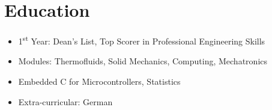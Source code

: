 \documentclass{cv}
\begin{document}
\section{Education}
\begin{subsections}
    \subtitle{MEng Mechanical Engineering \hfill London, United Kingdom}
    \begin{itemize}
        \item 1\textsuperscript{st} Year: Dean's List, Top Scorer in Professional Engineering Skills
        \item Modules: Thermofluids, Solid Mechanics, Computing, Mechatronics
        \item Embedded C for Microcontrollers, Statistics
        \item Extra-curricular: German
    \end{itemize}
\end{subsections}
\end{document}
